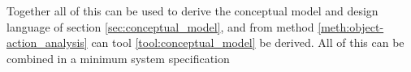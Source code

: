 




Together all of this can be used to derive the conceptual model and design language of section \ref{sec:conceptual_model}, and from method \ref{meth:object-action_analysis} can tool \ref{tool:conceptual_model} be derived. \cite[p. 67]{benyon14} All of this can be combined in a minimum system specification


